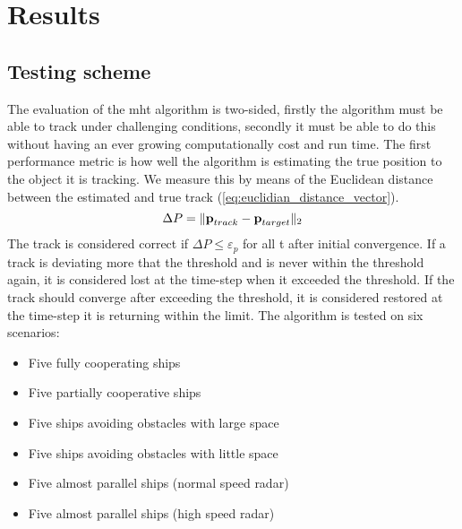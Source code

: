 \section{Results}
\label{sec:results}

\subsection{Testing scheme}
The evaluation of the \gls{mht} algorithm is two-sided, firstly the algorithm must be able to track under challenging conditions, secondly it must be able to do this without having an ever growing computationally cost and run time. The first performance metric is how well the algorithm is estimating the true position to the object it is tracking. We measure this by means of the Euclidean distance between the estimated and true track (\ref{eq:euclidian_distance_vector}).
\begin{equation}
	\Delta P = \| \boldsymbol{\mathbf{p}}_{track}-\boldsymbol{\mathbf{p}}_{target} \|_2
\label{eq:euclidian_distance_vector}
\end{equation}
The track is considered correct if $\Delta P \leq \varepsilon_p$ for all t after initial convergence. If a track is deviating more that the threshold and is never within the threshold again, it is considered lost at the time-step when it exceeded the threshold. If the track should converge after exceeding the threshold, it is considered restored at the time-step it is returning within the limit. The algorithm is tested on six scenarios:
\begin{itemize}
	\item Five fully cooperating ships
    \item Five partially cooperative ships
    \item Five ships avoiding obstacles with large space
    \item Five ships avoiding obstacles with little space
	\item Five almost parallel ships (normal speed \gls{radar})
	\item Five almost parallel ships (high speed \gls{radar})
\end{itemize}
